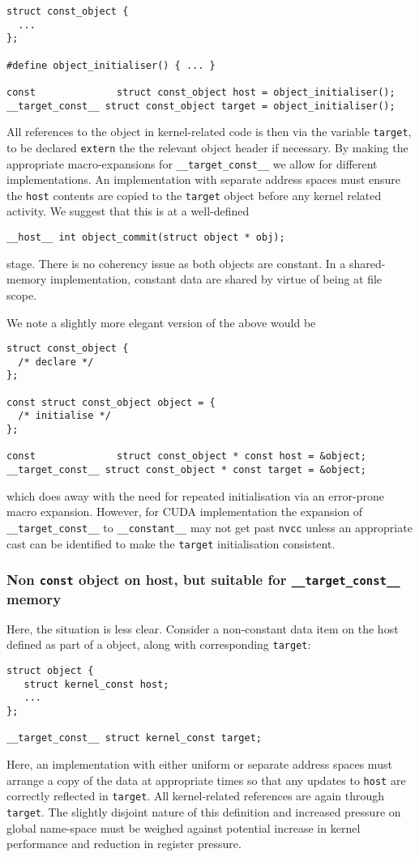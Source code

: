 \begin{lstlisting}
struct const_object {
  ...
};

#define object_initialiser() { ... }

const              struct const_object host = object_initialiser();
__target_const__ struct const_object target = object_initialiser();
\end{lstlisting}
All references to the object in kernel-related code is then via the
variable \texttt{target}, to be declared \texttt{extern} the the
relevant object header if necessary.
By making the appropriate macro-expansions for \texttt{\_\_target\_const\_\_}
we allow for different implementations. An implementation with separate
address spaces must ensure the \texttt{host}
contents are copied to the \texttt{target} object before any kernel
related activity. We suggest that this is at a well-defined
\begin{lstlisting}
__host__ int object_commit(struct object * obj);
\end{lstlisting}
stage. There is no coherency issue as both objects are constant. In a
shared-memory implementation, constant data are shared by virtue of
being at file scope.

We note a slightly more elegant version of the above would be
\begin{lstlisting}
struct const_object {
  /* declare */
};

const struct const_object object = {
  /* initialise */
};

const              struct const_object * const host = &object;
__target_const__ struct const_object * const target = &object;
\end{lstlisting}
which does away with the need for repeated initialisation via
an error-prone macro expansion. However,
for CUDA implementation the expansion of \texttt{\_\_target\_const\_\_}
to \texttt{\_\_constant\_\_}
may not get past \texttt{nvcc} unless an appropriate cast can
be identified to make the \texttt{target} initialisation consistent.

\subsubsection{Non \texttt{const} object on host, but suitable for
\texttt{\_\_target\_const\_\_} memory}

Here, the situation is less clear. Consider a non-constant data item
on the host defined as part of a object, along with corresponding
\texttt{target}:
\begin{lstlisting}
struct object {
   struct kernel_const host;
   ...
};

__target_const__ struct kernel_const target;

\end{lstlisting}
Here, an implementation with either uniform or separate address
spaces must arrange a copy of the data at appropriate times so
that any updates to \texttt{host} are correctly reflected
in \texttt{target}. All kernel-related references are again through
\texttt{target}.
The slightly disjoint nature of this definition and increased pressure
on global name-space must be weighed against potential increase in kernel
performance and reduction in register pressure.

